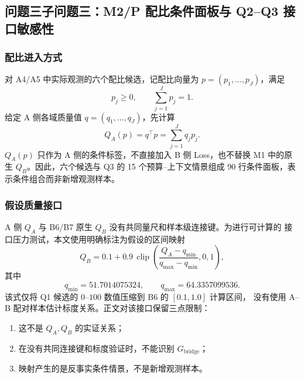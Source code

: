 
\subsection{问题三子问题三：M2/P 配比条件面板与 Q2--Q3 接口敏感性}
\label{sec:q3-subproblem3}

\subsubsection{配比进入方式}

对 A4/A5 中实际观测的六个配比候选，记配比向量为
$p=(p_1,\ldots,p_J)$，满足
\begin{equation}
 p_j\ge0,\qquad \sum_{j=1}^{J}p_j=1.
\end{equation}
给定 A 侧各域质量值 $q=(q_1,\ldots,q_J)$，先计算
\begin{equation}
 Q_A(p)=q^\top p=\sum_{j=1}^{J}q_jp_j.
 \label{eq:q3-sp3-qa}
\end{equation}
$Q_A(p)$ 只作为 A 侧的条件标签，不直接加入 B 侧 Loss，也不替换
M1 中的原生 $Q_B$。因此，六个候选与 Q3 的 15 个预算--上下文情景组成
90 行条件面板，表示条件组合而非新增观测样本。

\subsubsection{假设质量接口}

A 侧 $Q_A$ 与 B6/B7 原生 $Q_B$ 没有共同量尺和样本级连接键。为进行可计算的
接口压力测试，本文使用明确标注为假设的区间映射
\begin{equation}
 Q_B=0.1+0.9\,\operatorname{clip}
 \left(\frac{Q_A-q_{\min}}{q_{\max}-q_{\min}},0,1\right),
 \label{eq:q3-sp3-hyp-map}
\end{equation}
其中
\begin{equation}
 q_{\min}=51.7014075324,\qquad q_{\max}=64.3357099536.
 \label{eq:q3-sp3-map-range}
\end{equation}
该式仅将 Q1 候选的 $0$--$100$ 数值压缩到 B6 的 $[0.1,1.0]$ 计算区间，
没有使用 A--B 配对样本估计标度关系。正文对该接口保留三点限制：
\begin{enumerate}
  \item 这不是 $Q_A,Q_B$ 的实证关系；
  \item 在没有共同连接键和标度验证时，不能识别 $G_{\mathrm{bridge}}$；
  \item 映射产生的是反事实条件情景，不是新增观测样本。
\end{enumerate}

